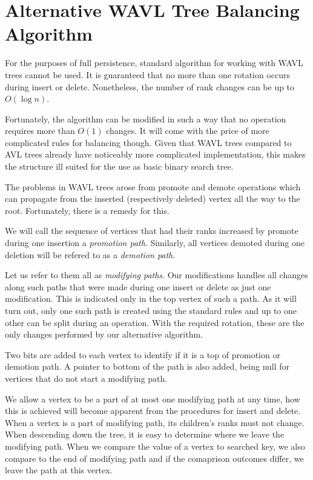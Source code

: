 \section{Alternative WAVL Tree Balancing Algorithm}

For the purposes of full persistence, standard algorithm for working with WAVL trees cannot be used. It is guaranteed that no more than one rotation occurs during insert or delete. Nonetheless, the number of rank changes can be up to $O(\log n)$. 

Fortunately, the algorithm can be modified in such a way that no operation requires more than $O(1)$ changes. It will come with the price of more complicated rules for balancing though. Given that WAVL trees compared to AVL trees already have noticeably more complicated implementation, this makes the structure ill suited for the use as basic binary search tree. 

The problems in WAVL trees arose from promote and demote operations which can propagate from the inserted (respectively deleted) vertex all the way to the root. Fortunately, there is a remedy for this. 

We will call the sequence of vertices that had their ranks increased by promote during one insertion a {\em promotion path}. Similarly, all vertices demoted during one deletion will be refered to as a {\em demotion path}.

Let us refer to them all as {\em modifying paths}. Our modifications handles all changes along such paths that were made during one insert or delete as just one modification. This is indicated only in the top vertex of such a path. As it will turn out, only one such path is created using the standard rules and up to one other can be split during an operation. With the required rotation, these are the only changes performed by our alternative algorithm.


Two bits are added to each vertex to identify if it is a top of promotion or demotion path. A pointer to bottom of the path is also added, being null for vertices that do not start a modifying path.

We allow a vertex to be a part of at most one modifying path at any time, how this is achieved will become apparent from the procedures for insert and delete. When a vertex is a part of modifying path, its children's ranks must not change. When descending down the tree, it is easy to determine where we leave the modifying path. When we compare the value of a vertex to searched key, we also compare to the end of modifying path and if the comaprison outcomes differ, we leave the path at this vertex. 

